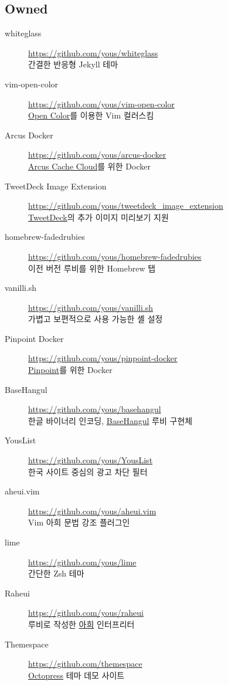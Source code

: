 \documentclass[a4paper,10pt]{article}
\begin{document}
\subsection{Owned}
\begin{description}
  \item[whiteglass] \url{https://github.com/yous/whiteglass} \\
    간결한 반응형 Jekyll 테마
  \item[vim-open-color] \url{https://github.com/yous/vim-open-color} \\
    \href{https://yeun.github.io/open-color/}{Open Color}를 이용한 Vim 컬러스킴
  \item[Arcus Docker] \url{https://github.com/yous/arcus-docker} \\
    \href{https://github.com/naver/arcus}{Arcus Cache Cloud}를 위한 Docker
  \item[TweetDeck Image Extension] \url{https://github.com/yous/tweetdeck_image_extension} \\
    \href{https://tweetdeck.twitter.com}{TweetDeck}의 추가 이미지 미리보기 지원
  \item[homebrew-fadedrubies] \url{https://github.com/yous/homebrew-fadedrubies} \\
    이전 버전 루비를 위한 Homebrew 탭
  \item[vanilli.sh] \url{https://github.com/yous/vanilli.sh} \\
    가볍고 보편적으로 사용 가능한 셸 설정
  \item[Pinpoint Docker] \url{https://github.com/yous/pinpoint-docker} \\
    \href{https://github.com/naver/pinpoint}{Pinpoint}를 위한 Docker
  \item[BaseHangul] \url{https://github.com/yous/basehangul} \\
    한글 바이너리 인코딩, \href{https://basehangul.github.io}{BaseHangul} 루비 구현체
  \item[YousList] \url{https://github.com/yous/YousList} \\
    한국 사이트 중심의 광고 차단 필터
  \item[aheui.vim] \url{https://github.com/yous/aheui.vim} \\
    Vim 아희 문법 강조 플러그인
  \item[lime] \url{https://github.com/yous/lime} \\
    간단한 Zsh 테마
  \item[Raheui] \url{https://github.com/yous/raheui} \\
    루비로 작성한 \href{http://aheui.github.io}{아희} 인터프리터
  \item[Themespace] \url{https://github.com/themespace} \\
    \href{http://octopress.org}{Octopress} 테마 데모 사이트
\end{description}
\end{document}
